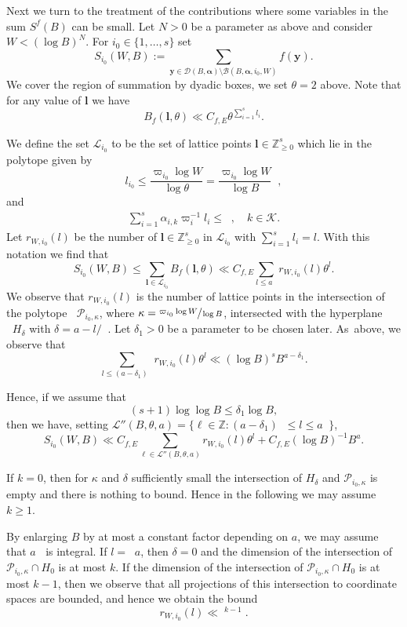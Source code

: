 \documentclass[JEP,XML,SOM,Unicode,published]{cedram}
\DeclareMathOperator{\LBt}{\mathit{L(B,\theta)}}
\newcommand{\cB}{\mathcal{B}}
\newcommand{\cD}{\mathcal{D}}
\newcommand{\cBalp}{\cD(B,\bfalp)}
\newcommand{\cBalpgen}[1]{\cB(B,\bfalp,#1)}
\newcommand{\cLBta}{\calL''(B,\theta,a)}
\let\del\delta
\let\tet\theta
\newcommand{\bfy}{\boldsymbol{y}}
\newcommand{\bfalp}{\boldsymbol{\alpha}}
\newcommand{\bfl}{\boldsymbol{l}}
\newcommand{\calK}{\mathcal{K}}
\newcommand{\calL}{\mathcal{L}}
\newcommand\ZZ{\mathbb{Z}}
\newcommand{\Z}{\mathbb{Z}}
\theoremstyle{definition}
\numberwithin{theorem}{section}
\begin{document}
Next we turn to the treatment of the contributions where some variables in the sum $S^f(B)$ can be small. Let $N>0$ be a parameter as above and consider $W< (\log B)^N$. For $i_0\in \{1,\ldots, s\}$ set
\[
S_{i_0}(W,B):= \sum_{\bfy\in\cBalp\setminus\cBalpgen{i_0,W}}f(\bfy).
\]
We cover the region of summation by dyadic boxes, \ie we set $\theta=2$ above. Note that for any value of $\bfl$ we have
\[
B_f(\bfl,\theta)\ll C_{f,E} \theta^{\sum_{i=1}^s l_i}.
\]

We define the set $\mathcal{L}_{i_0}$ to be the set of lattice points $\bfl\in\ZZ_{\geq 0}^s$ which lie in the polytope given by
\[
l_{i_0} \leq \frac{\varpi_{i_0} \log W}{\log \tet}= \frac{\varpi_{i_0}\log W}{\log B} \LBt,
\]
and
\begin{gather*}
\sum_{i=1}^s \alpha_{i,k} \varpi_i^{-1}l_i \leq \LBt,\quad k\in \calK.
\end{gather*}
Let $r_{W,i_0}(l)$ be the number of $\bfl\in \Z_{\geq 0}^s$ in $\mathcal{L}_{i_0}$ with $\sum_{i=1}^s l_i=l$. With this notation we find that
\[
S_{i_0}(W,B)\leq \sum_{\bfl\in \mathcal{L}_{i_0}}B_f(\bfl,\theta) \ll C_{f,E}\sum_{l\leq a \LBt} r_{W,i_0}(l) \theta^l.
\]
We observe that $r_{W,i_0}(l)$ is the number of lattice points in the intersection of the polytope $\LBt \mathcal{P}_{i_0,\kappa}$, where $\kappa= \sfrac{\varpi_{i_0}\log W}{\log B}$, intersected with the hyperplane $\LBt H_{\delta}$ with $\delta =a- l/{\LBt}$. Let $\del_1>0$ be a parameter to be chosen later. As~above, we observe that
\[
\sum_{l\leq (a-\del_1)\LBt} r_{W,i_0}(l) \theta^l \ll (\log B)^s B^{a-\del_1}.
\]

Hence, if we assume that
\begin{equation}\label{eqndel1}
(s+1) \log \log B \leq \del_1 \log B,
\end{equation}
then we have, setting $\cLBta=\{\ell\in\ZZ:(a-\del_1) \LBt \leq l\leq a \LBt\}$,
\[
S_{i_0}(W,B)\ll C_{f,E}\sum_{\ell\in\cLBta} r_{W,i_0}(l) \theta^l + C_{f,E} (\log B)^{-1} B^a.
\]

If $k=0$, then for $\kappa$ and $\delta$ sufficiently small the intersection of $H_\delta$ and $\mathcal{P}_{i_0,\kappa}$ is empty and there is nothing to bound. Hence in the following we may assume $k\geq 1$.\par
By enlarging $B$ by at most a constant factor depending on $a$, we may assume that $a\LBt$ is integral. If $l=\LBt a$, then $\del=0$ and the dimension of the intersection of $\mathcal{P}_{i_0,\kappa}\cap H_0$ is at most $k$. If the dimension of the intersection of $\mathcal{P}_{i_0,\kappa}\cap H_0$ is at most $k-1$, then we observe that all projections of this intersection to coordinate spaces are bounded, and hence we obtain the bound
\[
r_{W,i_0}(l)\ll \LBt^{k-1}.
\]
\end{document}

